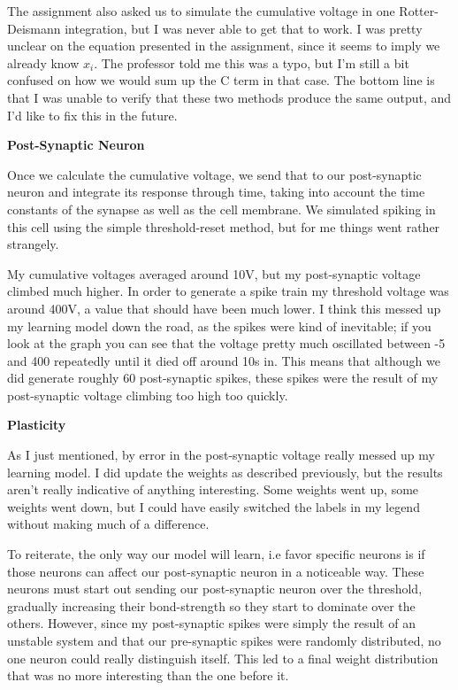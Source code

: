 \documentclass[a4paper,12pt]{article}
\begin{document}
\vspace{2mm}

The assignment also asked us to simulate the cumulative voltage in one Rotter-Deismann integration, but I was never able to get that to work. I was pretty unclear on the equation presented in the assignment, since it seems to imply we already know $x_i$. The professor told me this was a typo, but I'm still a bit confused on how we would sum up the C term in that case. The bottom line is that I was unable to verify that these two methods produce the same output, and I'd like to fix this in the future. 

\bigskip
{\bf Post-Synaptic Neuron}
\bigskip

Once we calculate the cumulative voltage, we send that to our post-synaptic neuron and integrate its response through time, taking into account the time constants of the synapse as well as the cell membrane. We simulated spiking in this cell using the simple threshold-reset method, but for me things went rather strangely. 

\vspace{2mm}

My cumulative voltages averaged around 10V, but my post-synaptic voltage climbed much higher. In order to generate a spike train my threshold voltage was around 400V, a value that should have been much lower. I think this messed up my learning model down the road, as the spikes were kind of inevitable; if you look at the graph you can see that the voltage pretty much oscillated between -5 and 400 repeatedly until it died off around 10s in. This means that although we did generate roughly 60 post-synaptic spikes, these spikes were the result of my post-synaptic voltage climbing too high too quickly. 

\bigskip
{\bf Plasticity}
\bigskip

As I just mentioned, by error in the post-synaptic voltage really messed up my learning model. I did update the weights as described previously, but the results aren't really indicative of anything interesting. Some weights went up, some weights went down, but I could have easily switched the labels in my legend without making much of a difference. 

\vspace{2mm}

To reiterate, the only way our model will learn, i.e favor specific neurons is if those neurons can affect our post-synaptic neuron in a noticeable way. These neurons must start out sending our post-synaptic neuron over the threshold, gradually increasing their bond-strength so they start to dominate over the others. However, since my post-synaptic spikes were simply the result of an unstable system and that our pre-synaptic spikes were randomly distributed, no one neuron could really distinguish itself. This led to a final weight distribution that was no more interesting than the one before it.
\end{document}
